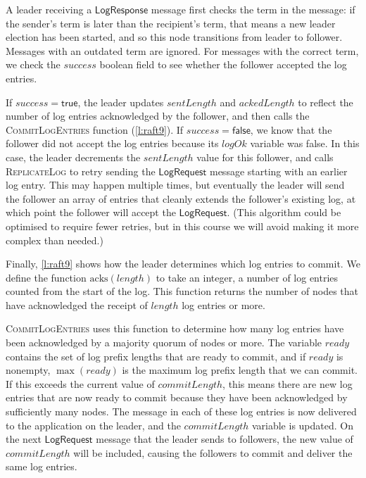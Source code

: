
A leader receiving a $\mathsf{LogResponse}$ message first checks the term in the message: if the sender's term is later than the recipient's term, that means a new leader election has been started, and so this node transitions from leader to follower.
Messages with an outdated term are ignored.
For messages with the correct term, we check the $\mathit{success}$ boolean field to see whether the follower accepted the log entries.

If $\mathit{success} = \mathsf{true}$, the leader updates $\mathit{sentLength}$ and $\mathit{ackedLength}$ to reflect the number of log entries acknowledged by the follower, and then calls the \textsc{CommitLogEntries} function (\autoref{l:raft9}).
If $\mathit{success} = \mathsf{false}$, we know that the follower did not accept the log entries because its $\mathit{logOk}$ variable was false.
In this case, the leader decrements the $\mathit{sentLength}$ value for this follower, and calls \textsc{ReplicateLog} to retry sending the $\mathsf{LogRequest}$ message starting with an earlier log entry.
This may happen multiple times, but eventually the leader will send the follower an array of entries that cleanly extends the follower's existing log, at which point the follower will accept the $\mathsf{LogRequest}$.
(This algorithm could be optimised to require fewer retries, but in this course we will avoid making it more complex than needed.)

Finally, \autoref{l:raft9} shows how the leader determines which log entries to commit.
We define the function $\mathrm{acks}(\mathit{length})$ to take an integer, a number of log entries counted from the start of the log.
This function returns the number of nodes that have acknowledged the receipt of $\mathit{length}$ log entries or more.

\textsc{CommitLogEntries} uses this function to determine how many log entries have been acknowledged by a majority quorum of nodes or more.
The variable $\mathit{ready}$ contains the set of log prefix lengths that are ready to commit, and if $\mathit{ready}$ is nonempty, $\max(\mathit{ready})$ is the maximum log prefix length that we can commit.
If this exceeds the current value of $\mathit{commitLength}$, this means there are new log entries that are now ready to commit because they have been acknowledged by sufficiently many nodes.
The message in each of these log entries is now delivered to the application on the leader, and the $\mathit{commitLength}$ variable is updated.
On the next $\mathsf{LogRequest}$ message that the leader sends to followers, the new value of $\mathit{commitLength}$ will be included, causing the followers to commit and deliver the same log entries.

